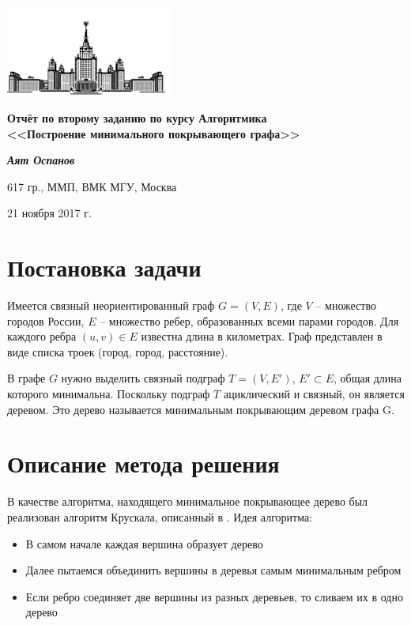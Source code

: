 \documentclass[12pt, a4paper]{article}
\begin{document}
    \begin{singlespace}
    \begin{center}
        \includegraphics[height=3cm]{msu.png}

        {\large\textbf{Отчёт по второму заданию по курсу Алгоритмика\\
        <<Построение минимального покрывающего графа>>}}

        \vspace{0.3cm}

        \textit{\textbf{Аят Оспанов}}

        617 гр., ММП, ВМК МГУ, Москва

        21 ноября 2017 г.
    \end{center}
    \end{singlespace}

    \tableofcontents

    \section{Постановка задачи}
        Имеется связный неориентированный граф $G=(V,E)$, где $V$ -- множество городов России, $E$ -- множество ребер,
    образованных всеми парами городов. Для каждого ребра $(u,v) \in E$ известна длина в километрах.
    Граф представлен в виде списка троек (город, город, расстояние).

        В графе $G$ нужно выделить связный подграф $T=(V,E')$, $E' \subset E$, общая длина
    которого минимальна. Поскольку подграф $T$ ациклический и связный, он является деревом.
    Это дерево называется минимальным покрывающим деревом графа G.

    \section{Описание метода решения}
        В качестве алгоритма, находящего минимальное покрывающее дерево был реализован алгоритм Крускала, описанный в \cite[стр. 668-670]{clrs}. Идея алгоритма:
        \begin{itemize}
            \item В самом начале каждая вершина образует дерево
            \item Далее пытаемся объединить вершины в деревья самым минимальным ребром
            \item Если ребро соединяет две вершины из разных деревьев, то сливаем их в одно дерево
        \end{itemize}
\end{document}
